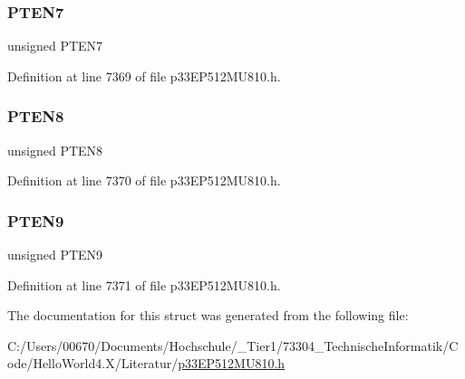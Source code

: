 \subsubsection{\texorpdfstring{P\+T\+E\+N7}{PTEN7}}
{\footnotesize\ttfamily unsigned P\+T\+E\+N7}



Definition at line 7369 of file p33\+E\+P512\+M\+U810.\+h.

\mbox{\label{structtag_p_m_a_e_n_b_i_t_s_a20da875da2502520dfd35385782f36d6}} 
\subsubsection{\texorpdfstring{P\+T\+E\+N8}{PTEN8}}
{\footnotesize\ttfamily unsigned P\+T\+E\+N8}



Definition at line 7370 of file p33\+E\+P512\+M\+U810.\+h.

\mbox{\label{structtag_p_m_a_e_n_b_i_t_s_a1b5624a087b9ca15d798955ca5b37a8c}} 
\subsubsection{\texorpdfstring{P\+T\+E\+N9}{PTEN9}}
{\footnotesize\ttfamily unsigned P\+T\+E\+N9}



Definition at line 7371 of file p33\+E\+P512\+M\+U810.\+h.



The documentation for this struct was generated from the following file\+:\begin{DoxyCompactItemize}
\item 
C\+:/\+Users/00670/\+Documents/\+Hochschule/\+\_\+\+Tier1/73304\+\_\+\+Technische\+Informatik/\+Code/\+Hello\+World4.\+X/\+Literatur/\hyperlink{p33_e_p512_m_u810_8h}{p33\+E\+P512\+M\+U810.\+h}\end{DoxyCompactItemize}
